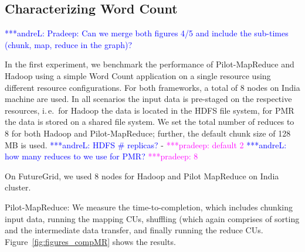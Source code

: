 \documentclass{acm_proc_article-sp}
\newcommand{\alnote}[1]{ {\textcolor{blue} { ***andreL: #1 }}}
\newcommand{\pnote}[1]{ {\textcolor{magenta} { ***pradeep: #1 }}}
\newcommand{\alnote}[1]{}
\newcommand{\pnote}[1]{}
\newcommand{\pilotmapreduce}{Pilot-MapReduce\xspace}
\begin{document}

\subsection{Characterizing Word Count}
\alnote{Pradeep: Can we merge both figures 4/5 and include the sub-times (chunk, map, reduce in the graph)?}

In the first experiment, we benchmark the performance of \pilotmapreduce and Hadoop using a
simple Word Count application on a single resource using different resource configurations.
For both frameworks, a total of 8 nodes on India machine are used. In all scenarios the
input data is pre-staged on the respective resources, i.\,e.\ for Hadoop the data is
located in the HDFS file system, for PMR the data is stored on a shared file system. We set
the total number of reduces to 8 for both Hadoop and \pilotmapreduce; further, the default
chunk size of 128\,MB is used.\alnote{HDFS \# replicas?} - \pnote{default 2}\alnote{how
many reduces to we use for PMR?} \pnote{8}

On FutureGrid, we used 8 nodes for Hadoop and Pilot MapReduce on India cluster. 



\pilotmapreduce: We measure the time-to-completion, which includes chunking input data, 
running the mapping CUs, shuffling (which again comprises of sorting and the intermediate 
data transfer, and finally running the reduce CUs. Figure~\ref{fig:figures_compMR} 
shows the results.

\end{document}
